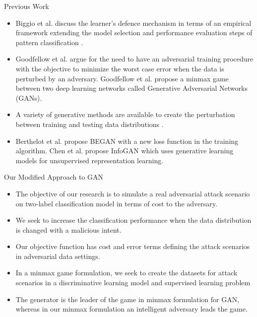 \documentclass[10pt]{beamer}
\begin{document}
\begin{frame}{Previous Work}
	\begin{itemize}
		\item Biggio et al. \cite{biggio2013security} discuss the learner’s defence mechanism in terms of an empirical framework extending the model selection and performance evaluation steps of pattern classification \cite{duda2012pattern}. 
		\item Goodfellow et al. \cite{goodfellow2014generative} argue for the need to have an adversarial training procedure with the objective to minimize the worst case error when the data is perturbed by an adversary. Goodfellow et al. \cite{goodfellow2014generative} propose a minmax game between two deep learning networks called Generative Adversarial Networks (GANs). 
		\item A variety of generative methods are available to create the perturbation between training and testing data distributions \cite{papernot2016towards}.
        \item Berthelot et al. \cite{berthelot2017began} propose BEGAN with a new loss function in the training algorithm. Chen et al. \cite{chen2016infogan} propose InfoGAN which uses generative learning models for unsupervised representation learning.
	\end{itemize} 
\end{frame}



\begin{frame}{Our Modified Approach to GAN}
	\begin{itemize}
		\item The objective of our research is to simulate a real adversarial attack scenario on two-label classification model in terms of cost to the adversary. 
		\item We seek to increase the classification performance when the data distribution is changed with a malicious intent. 
		\item Our objective function has cost and error terms defining the attack scenarios in adversarial data settings.
		\item In a minmax game formulation, we seek to create the datasets for attack scenarios in a discriminative learning model and supervised learning problem
		\item The generator is the leader of the game in minmax formulation for GAN, whereas in our minmax formulation an intelligent adversary leads the game. 

	\end{itemize}
\end{frame}
\end{document}
